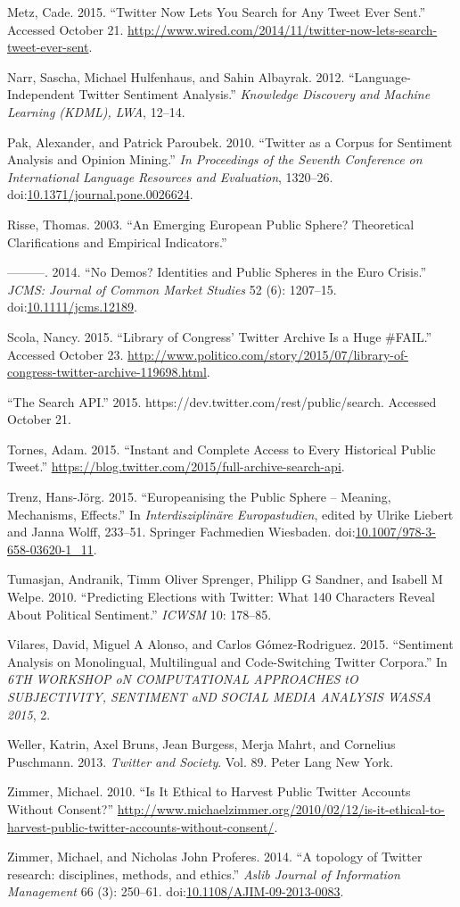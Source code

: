 \documentclass[]{article}
\begin{document}
Metz, Cade. 2015. ``Twitter Now Lets You Search for Any Tweet Ever
Sent.'' Accessed October 21.
\url{http://www.wired.com/2014/11/twitter-now-lets-search-tweet-ever-sent}.

Narr, Sascha, Michael Hulfenhaus, and Sahin Albayrak. 2012.
``Language-Independent Twitter Sentiment Analysis.'' \emph{Knowledge
Discovery and Machine Learning (KDML), LWA}, 12--14.

Pak, Alexander, and Patrick Paroubek. 2010. ``Twitter as a Corpus for
Sentiment Analysis and Opinion Mining.'' \emph{In Proceedings of the
Seventh Conference on International Language Resources and Evaluation},
1320--26.
doi:\href{http://dx.doi.org/10.1371/journal.pone.0026624}{10.1371/journal.pone.0026624}.

Risse, Thomas. 2003. ``An Emerging European Public Sphere? Theoretical
Clarifications and Empirical Indicators.''

---------. 2014. ``No Demos? Identities and Public Spheres in the Euro
Crisis.'' \emph{JCMS: Journal of Common Market Studies} 52 (6):
1207--15.
doi:\href{http://dx.doi.org/10.1111/jcms.12189}{10.1111/jcms.12189}.

Scola, Nancy. 2015. ``Library of Congress' Twitter Archive Is a Huge
\#FAIL.'' Accessed October 23.
\url{http://www.politico.com/story/2015/07/library-of-congress-twitter-archive-119698.html}.

``The Search API.'' 2015. https://dev.twitter.com/rest/public/search.
Accessed October 21.

Tornes, Adam. 2015. ``Instant and Complete Access to Every Historical
Public Tweet.''
\url{https://blog.twitter.com/2015/full-archive-search-api}.

Trenz, Hans-Jörg. 2015. ``Europeanising the Public Sphere -- Meaning,
Mechanisms, Effects.'' In \emph{Interdisziplinäre Europastudien}, edited
by Ulrike Liebert and Janna Wolff, 233--51. Springer Fachmedien
Wiesbaden.
doi:\href{http://dx.doi.org/10.1007/978-3-658-03620-1_11}{10.1007/978-3-658-03620-1\_11}.

Tumasjan, Andranik, Timm Oliver Sprenger, Philipp G Sandner, and Isabell
M Welpe. 2010. ``Predicting Elections with Twitter: What 140 Characters
Reveal About Political Sentiment.'' \emph{ICWSM} 10: 178--85.

Vilares, David, Miguel A Alonso, and Carlos G{ó}mez-Rodr{i}guez. 2015.
``Sentiment Analysis on Monolingual, Multilingual and Code-Switching
Twitter Corpora.'' In \emph{6TH WORKSHOP oN COMPUTATIONAL APPROACHES tO
SUBJECTIVITY, SENTIMENT aND SOCIAL MEDIA ANALYSIS WASSA 2015}, 2.

Weller, Katrin, Axel Bruns, Jean Burgess, Merja Mahrt, and Cornelius
Puschmann. 2013. \emph{Twitter and Society}. Vol. 89. Peter Lang New
York.

Zimmer, Michael. 2010. ``Is It Ethical to Harvest Public Twitter
Accounts Without Consent?''
\url{http://www.michaelzimmer.org/2010/02/12/is-it-ethical-to-harvest-public-twitter-accounts-without-consent/}.

Zimmer, Michael, and Nicholas John Proferes. 2014. ``A topology of
Twitter research: disciplines, methods, and ethics.'' \emph{Aslib
Journal of Information Management} 66 (3): 250--61.
doi:\href{http://dx.doi.org/10.1108/AJIM-09-2013-0083}{10.1108/AJIM-09-2013-0083}.
\end{document}

